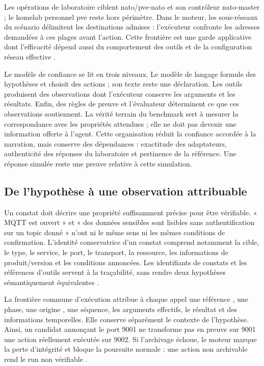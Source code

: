 \documentclass[11pt,a4paper]{article}
\DeclareRobustCommand{\code}[1]{{\small\path{#1}}}
\begin{document}
Les opérations de laboratoire ciblent nato/pve-nato et son contrôleur
nato-master ; le homelab personnel pve reste hors périmètre. Dans le moteur,
les sous-réseaux du scénario délimitent les destinations admises : l'exécuteur
confronte les adresses demandées à ces plages avant l'action. Cette frontière
est une garde applicative dont l'efficacité dépend aussi du comportement des
outils et de la configuration réseau effective
\cite{arch-executeur}.

Le modèle de confiance se lit en trois niveaux. Le modèle de langage formule
des hypothèses et choisit des actions ; son texte reste une déclaration. Les
outils produisent des observations dont l'exécuteur conserve les arguments et
les résultats. Enfin, des règles de preuve et l'évaluateur déterminent ce que
ces observations soutiennent. La vérité terrain du benchmark sert à mesurer
la correspondance avec les propriétés attendues ; elle ne doit pas devenir
une information offerte à l'agent. Cette organisation réduit la confiance
accordée à la narration, mais conserve des dépendances : exactitude des
adaptateurs, authenticité des réponses du laboratoire et pertinence de la
référence. Une réponse simulée reste une preuve relative à cette simulation.


\subsection{De l'hypothèse à une observation attribuable}

Un constat doit décrire une propriété suffisamment précise pour être
vérifiable. « MQTT est ouvert » et « des données sensibles sont lisibles sans
authentification sur un topic donné » n'ont ni le même sens ni les mêmes
conditions de confirmation. L'identité conservatrice d'un constat comprend
notamment la cible, le type, le service, le port, le transport, la ressource,
les informations de produit/version et les conditions annoncées. Les
identifiants de constats et les références d'outils servent à la traçabilité,
sans rendre deux hypothèses sémantiquement équivalentes
\cite{sec-identite}.

La frontière commune d'exécution attribue à chaque appel une référence
\code{tc-...}, une phase, une origine \code{runner}, une séquence, les
arguments effectifs, le résultat et des informations temporelles. Elle
conserve séparément le contexte de l'hypothèse. Ainsi, un candidat annonçant
le port 9001 ne transforme pas en preuve sur 9001 une action réellement
exécutée sur 9002. Si l'archivage échoue, le moteur marque la perte
d'intégrité et bloque la poursuite normale : une action non archivable rend
le run non vérifiable \cite{arch-executeur}.
\end{document}
